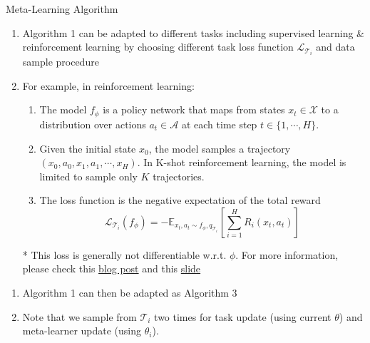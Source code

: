 \documentclass[compress]{beamer}
\begin{document}
\begin{frame}[allowframebreaks]{Meta-Learning Algorithm}
    \begin{enumerate}
        \item Algorithm 1 can be adapted to different tasks including supervised learning \& reinforcement learning by choosing different task loss function $\mathcal{L}_{\mathcal{T}_i}$ and data sample procedure
        \item For example, in reinforcement learning:
            \begin{enumerate}
                \item The model $f_{\phi}$ is a policy network that maps from states $x_t\in \mathcal{X}$ to a distribution over actions $a_t\in\mathcal{A}$ at each time step $t\in\{1,\cdots,H\}$.
                \item Given the initial state $x_0$, the model samples a trajectory $(x_0,a_0,x_1,a_1,\cdots,x_H)$. In K-shot reinforcement learning, the model is limited to sample only $K$ trajectories.
                \item The loss function is the negative expectation of the total reward
                    \begin{equation*}
                        \mathcal{L}_{\mathcal{T}_i}(f_{\phi}) = -\mathbb{E}_{x_t,a_t\sim f_{\phi},q_{\mathcal{T}_i}} \left[ \sum_{i=1}^H R_i(x_t,a_t) \right]
                    \end{equation*}
            \end{enumerate}
            \scriptsize{* This loss is generally not differentiable w.r.t. $\phi$. For more information, please check this \href{https://lilianweng.github.io/lil-log/2018/04/08/policy-gradient-algorithms.html}{blog post} and this \href{http://ipod825.github.io/presentations/variational_approaches_for_autoencoding_generative_adversarial_networks/main.pdf}{slide}}
    \end{enumerate}
    \framebreak
    \begin{enumerate}
        \item Algorithm 1 can then be adapted as Algorithm 3
        \item Note that we sample from $\mathcal{T}_i$ two times for task update (using current $\theta$) and meta-learner update (using $\theta_i$).
    \end{enumerate}
    \begin{center}

\end{center}
\end{frame}
\end{document}
